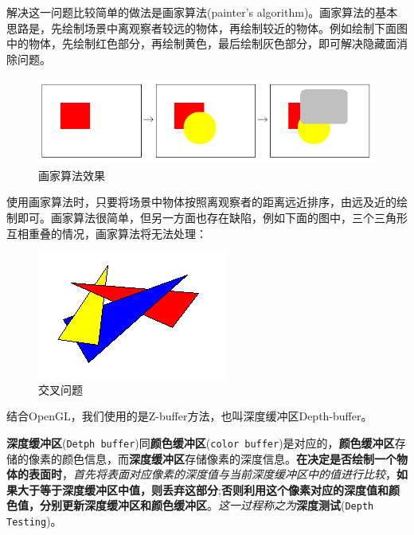 \documentclass[UTF8,a4paper,12pt]{ctexbook}
\begin{document}
			解决这一问题比较简单的做法是画家算法(painter’s algorithm)。画家算法的基本思路是，先绘制场景中离观察者较远的物体，再绘制较近的物体。例如绘制下面图中的物体，先绘制红色部分，再绘制黄色，最后绘制灰色部分，即可解决隐藏面消除问题。
				\begin{figure}[H]
					\centering
					\includegraphics[scale=0.7]{Z-Test}
					\caption{画家算法效果}
				\end{figure}
			
			使用画家算法时，只要将场景中物体按照离观察者的距离远近排序，由远及近的绘制即可。画家算法很简单，但另一方面也存在缺陷，例如下面的图中，三个三角形互相重叠的情况，画家算法将无法处理：
				\begin{figure}[H]
					\centering
					\includegraphics[scale=1.2]{Z-Test2}
					\caption{交叉问题}
				\end{figure}
				
			结合OpenGL，我们使用的是Z-buffer方法，也叫深度缓冲区Depth-buffer。
			
			\textbf{深度缓冲区}(\verb|Detph buffer|)同\textbf{颜色缓冲区}(\verb|color buffer|)是对应的，\textbf{颜色缓冲区}存储的像素的颜色信息，而\textbf{深度缓冲区}存储像素的深度信息。\textbf{在决定是否绘制一个物体的表面时}，\textit{首先将表面对应像素的深度值与当前深度缓冲区中的值进行比较}，\textbf{如果大于等于深度缓冲区中值，则丢弃这部分};\textbf{否则利用这个像素对应的深度值和颜色值，分别更新深度缓冲区和颜色缓冲区}。\textit{这一过程称之为}\textbf{深度测试}(\verb|Depth Testing|)。
\end{document}
